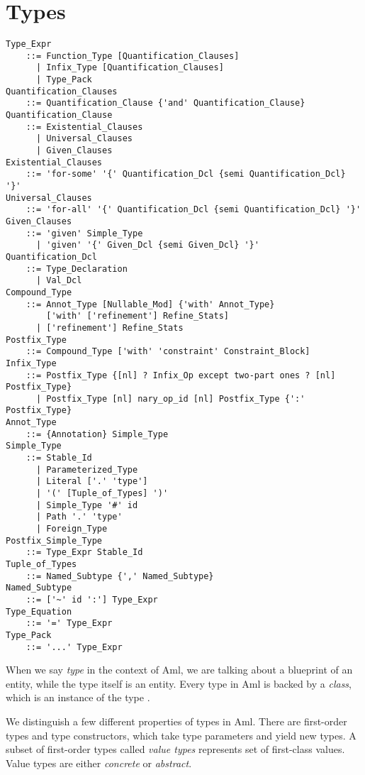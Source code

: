 
\chapter{Types}

\minitoc

\newpage

\grammar\begin{lstlisting}
Type_Expr
    ::= Function_Type [Quantification_Clauses]
      | Infix_Type [Quantification_Clauses]
      | Type_Pack
Quantification_Clauses 
    ::= Quantification_Clause {'and' Quantification_Clause}
Quantification_Clause  
    ::= Existential_Clauses
      | Universal_Clauses
      | Given_Clauses
Existential_Clauses 
    ::= 'for-some' '{' Quantification_Dcl {semi Quantification_Dcl} '}'
Universal_Clauses 
    ::= 'for-all' '{' Quantification_Dcl {semi Quantification_Dcl} '}'
Given_Clauses
    ::= 'given' Simple_Type
      | 'given' '{' Given_Dcl {semi Given_Dcl} '}'
Quantification_Dcl 
    ::= Type_Declaration
      | Val_Dcl
Compound_Type
    ::= Annot_Type [Nullable_Mod] {'with' Annot_Type} 
        ['with' ['refinement'] Refine_Stats]
      | ['refinement'] Refine_Stats
Postfix_Type 
    ::= Compound_Type ['with' 'constraint' Constraint_Block]
Infix_Type 
    ::= Postfix_Type {[nl] ? Infix_Op except two-part ones ? [nl] Postfix_Type}
      | Postfix_Type [nl] nary_op_id [nl] Postfix_Type {':' Postfix_Type}
Annot_Type 
    ::= {Annotation} Simple_Type
Simple_Type 
    ::= Stable_Id
      | Parameterized_Type
      | Literal ['.' 'type']
      | '(' [Tuple_of_Types] ')'
      | Simple_Type '#' id
      | Path '.' 'type'
      | Foreign_Type
Postfix_Simple_Type
    ::= Type_Expr Stable_Id
Tuple_of_Types 
    ::= Named_Subtype {',' Named_Subtype}
Named_Subtype
    ::= ['~' id ':'] Type_Expr
Type_Equation 
    ::= '=' Type_Expr
Type_Pack 
    ::= '...' Type_Expr
\end{lstlisting}

When we say \textit{type} in the context of Aml, we are talking about a blueprint of an entity, while the type itself is an entity. Every type in Aml is backed by a \textit{class}, which is an instance of the type \lstinline@Class@. 

We distinguish a few different properties of types in Aml. There are first-order types and type constructors, which take type parameters and yield new types. A subset of first-order types called \textit{value types} represents set of first-class values. Value types are either \textit{concrete} or \textit{abstract}. 

